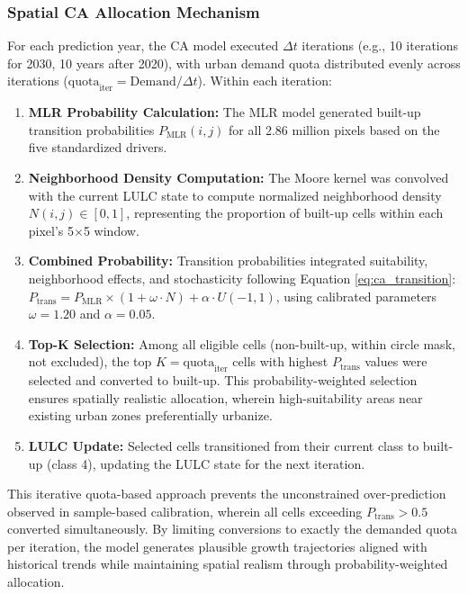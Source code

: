 \documentclass[12pt,a4paper]{article}
\begin{document}
\subsubsection{Spatial CA Allocation Mechanism}

For each prediction year, the CA model executed $\Delta t$ iterations (e.g., 10 iterations for 2030, 10 years after 2020), with urban demand quota distributed evenly across iterations ($\text{quota}_{\text{iter}} = \text{Demand} / \Delta t$). Within each iteration:

\begin{enumerate}
\item \textbf{MLR Probability Calculation:} The MLR model generated built-up transition probabilities $P_{\text{MLR}}(i,j)$ for all 2.86 million pixels based on the five standardized drivers.

\item \textbf{Neighborhood Density Computation:} The Moore kernel was convolved with the current LULC state to compute normalized neighborhood density $N(i,j) \in [0,1]$, representing the proportion of built-up cells within each pixel's 5$\times$5 window.

\item \textbf{Combined Probability:} Transition probabilities integrated suitability, neighborhood effects, and stochasticity following Equation \ref{eq:ca_transition}: $P_{\text{trans}} = P_{\text{MLR}} \times (1 + \omega \cdot N) + \alpha \cdot U(-1,1)$, using calibrated parameters $\omega=1.20$ and $\alpha=0.05$.

\item \textbf{Top-K Selection:} Among all eligible cells (non-built-up, within circle mask, not excluded), the top $K = \text{quota}_{\text{iter}}$ cells with highest $P_{\text{trans}}$ values were selected and converted to built-up. This probability-weighted selection ensures spatially realistic allocation, wherein high-suitability areas near existing urban zones preferentially urbanize.

\item \textbf{LULC Update:} Selected cells transitioned from their current class to built-up (class 4), updating the LULC state for the next iteration.
\end{enumerate}

This iterative quota-based approach prevents the unconstrained over-prediction observed in sample-based calibration, wherein all cells exceeding $P_{\text{trans}} > 0.5$ converted simultaneously. By limiting conversions to exactly the demanded quota per iteration, the model generates plausible growth trajectories aligned with historical trends while maintaining spatial realism through probability-weighted allocation.
\end{document}
